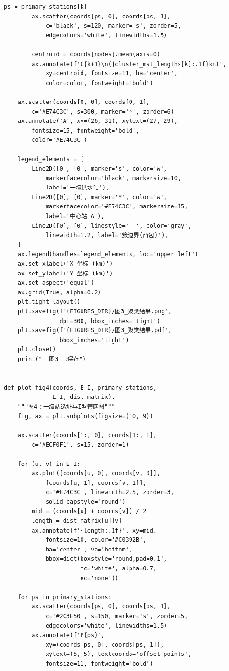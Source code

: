 \documentclass[12pt,a4paper]{ctexart}
\theoremstyle{definition}
\theoremstyle{plain}
\theoremstyle{remark}
\begin{document}
\begin{lstlisting}[caption={\texttt{visualization.py}：论文图表生成}]
        ps = primary_stations[k]
        ax.scatter(coords[ps, 0], coords[ps, 1],
            c='black', s=120, marker='s', zorder=5,
            edgecolors='white', linewidths=1.5)

        centroid = coords[nodes].mean(axis=0)
        ax.annotate(f'C{k+1}\n({cluster_mst_lengths[k]:.1f}km)',
            xy=centroid, fontsize=11, ha='center',
            color=color, fontweight='bold')

    ax.scatter(coords[0, 0], coords[0, 1],
        c='#E74C3C', s=300, marker='*', zorder=6)
    ax.annotate('A', xy=(26, 31), xytext=(27, 29),
        fontsize=15, fontweight='bold',
        color='#E74C3C')

    legend_elements = [
        Line2D([0], [0], marker='s', color='w',
            markerfacecolor='black', markersize=10,
            label='一级供水站'),
        Line2D([0], [0], marker='*', color='w',
            markerfacecolor='#E74C3C', markersize=15,
            label='中心站 A'),
        Line2D([0], [0], linestyle='--', color='gray',
            linewidth=1.2, label='簇边界(凸包)'),
    ]
    ax.legend(handles=legend_elements, loc='upper left')
    ax.set_xlabel('X 坐标 (km)')
    ax.set_ylabel('Y 坐标 (km)')
    ax.set_aspect('equal')
    ax.grid(True, alpha=0.2)
    plt.tight_layout()
    plt.savefig(f'{FIGURES_DIR}/图3_聚类结果.png',
                dpi=300, bbox_inches='tight')
    plt.savefig(f'{FIGURES_DIR}/图3_聚类结果.pdf',
                bbox_inches='tight')
    plt.close()
    print("  图3 已保存")


def plot_fig4(coords, E_I, primary_stations,
              L_I, dist_matrix):
    """图4：一级站选址与I型管网图"""
    fig, ax = plt.subplots(figsize=(10, 9))

    ax.scatter(coords[1:, 0], coords[1:, 1],
        c='#ECF0F1', s=15, zorder=1)

    for (u, v) in E_I:
        ax.plot([coords[u, 0], coords[v, 0]],
            [coords[u, 1], coords[v, 1]],
            c='#E74C3C', linewidth=2.5, zorder=3,
            solid_capstyle='round')
        mid = (coords[u] + coords[v]) / 2
        length = dist_matrix[u][v]
        ax.annotate(f'{length:.1f}', xy=mid,
            fontsize=10, color='#C0392B',
            ha='center', va='bottom',
            bbox=dict(boxstyle='round,pad=0.1',
                      fc='white', alpha=0.7,
                      ec='none'))

    for ps in primary_stations:
        ax.scatter(coords[ps, 0], coords[ps, 1],
            c='#2C3E50', s=150, marker='s', zorder=5,
            edgecolors='white', linewidths=1.5)
        ax.annotate(f'P{ps}',
            xy=(coords[ps, 0], coords[ps, 1]),
            xytext=(5, 5), textcoords='offset points',
            fontsize=11, fontweight='bold')


\end{lstlisting}
\end{document}
